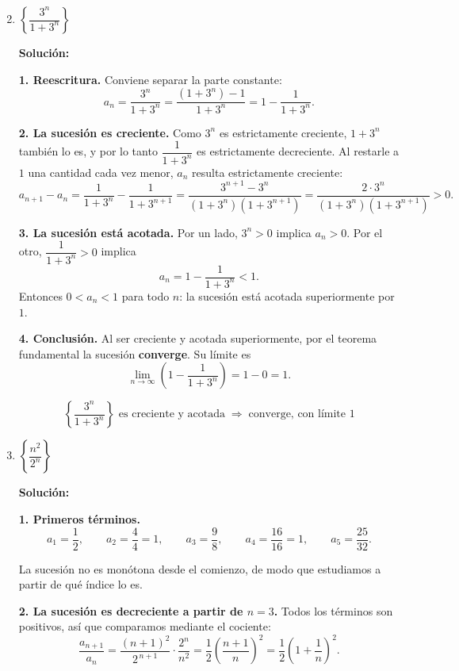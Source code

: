 \documentclass[12pt]{article}
\newcommand{\solucion}{%
    \vspace{0.8em}%
    \textbf{Solución:}%
}
\begin{document}
\begin{enumerate}[label=\alph*.-]

    \setcounter{enumi}{1} %

    \item $\left\{\dfrac{3^{n}}{1+3^{n}}\right\}$

    \solucion

    \textbf{1. Reescritura.} Conviene separar la parte constante:
    \[
    a_n=\frac{3^{n}}{1+3^{n}}
    =\frac{(1+3^{n})-1}{1+3^{n}}
    =1-\frac{1}{1+3^{n}} .
    \]

    \textbf{2. La sucesión es creciente.} Como $3^{n}$ es estrictamente
    creciente, $1+3^{n}$ también lo es, y por lo tanto
    $\dfrac{1}{1+3^{n}}$ es estrictamente decreciente. Al restarle a $1$ una
    cantidad cada vez menor, $a_n$ resulta estrictamente creciente:
    \[
    a_{n+1}-a_n
    =\frac{1}{1+3^{n}}-\frac{1}{1+3^{n+1}}
    =\frac{3^{n+1}-3^{n}}{(1+3^{n})(1+3^{n+1})}
    =\frac{2\cdot 3^{n}}{(1+3^{n})(1+3^{n+1})}>0 .
    \]

    \textbf{3. La sucesión está acotada.} Por un lado, $3^n>0$ implica
    $a_n>0$. Por el otro, $\dfrac{1}{1+3^{n}}>0$ implica
    \[
    a_n=1-\frac{1}{1+3^{n}}<1 .
    \]
    Entonces $0<a_n<1$ para todo $n$: la sucesión está acotada superiormente
    por $1$.

    \textbf{4. Conclusión.} Al ser creciente y acotada superiormente, por el
    teorema fundamental la sucesión \textbf{converge}. Su límite es
    \[
    \lim_{n\to\infty}\left(1-\frac{1}{1+3^{n}}\right)=1-0=1 .
    \]

    \[
    \boxed{
    \left\{\frac{3^{n}}{1+3^{n}}\right\}
    \text{ es creciente y acotada}\;\Rightarrow\;\text{converge, con límite }1
    }
    \]

				\newpage
    \item $\left\{\dfrac{n^{2}}{2^{n}}\right\}$

    \solucion

    \textbf{1. Primeros términos.}
    \[
    a_1=\frac12,\qquad
    a_2=\frac44=1,\qquad
    a_3=\frac98,\qquad
    a_4=\frac{16}{16}=1,\qquad
    a_5=\frac{25}{32}.
    \]

    La sucesión no es monótona desde el comienzo, de modo que estudiamos a
    partir de qué índice lo es.

    \textbf{2. La sucesión es decreciente a partir de $n=3$.} Todos los términos
    son positivos, así que comparamos mediante el cociente:
    \[
    \frac{a_{n+1}}{a_n}
    =\frac{(n+1)^{2}}{2^{\,n+1}}\cdot\frac{2^{n}}{n^{2}}
    =\frac12\left(\frac{n+1}{n}\right)^{2}
    =\frac12\left(1+\frac1n\right)^{2}.
    \]


\end{enumerate}
\end{document}
